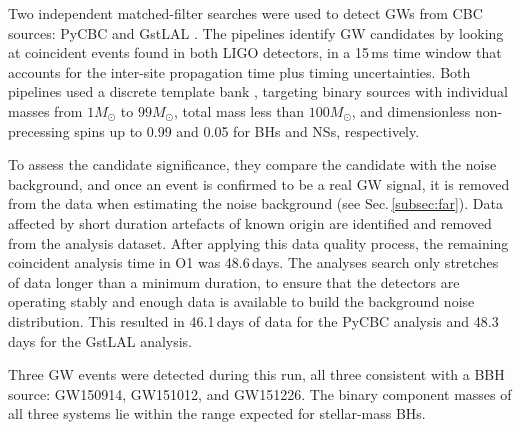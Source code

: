 \documentclass[binding=0.6cm, LaM]{sapthesis}
\begin{document}
	Two independent matched-filter searches were used to detect GWs from CBC sources: 
	{\ttfamily PyCBC} \cite{109, 110, 111, 112} and {\ttfamily GstLAL} \cite{112, 113, 114}.
	The pipelines identify GW candidates by looking at coincident events 
	found in both LIGO detectors, in a 15\,ms time window 
	that accounts for the inter-site propagation time plus timing uncertainties. 
	Both pipelines used a discrete template bank \cite{42, 114, 115, 117, 118, 119, 120}, 
	targeting binary sources with individual masses from $1{M_\odot}$ to $99{M_\odot}$,
	total mass less than $100{M_\odot}$, and dimensionless non-precessing spins up to 0.99 and 0.05 for BHs and NSs, respectively.

	To assess the candidate significance, they compare the candidate with the noise background, 
	and once an event is confirmed to be a real GW signal, 
	it is removed from the data when estimating the noise background (see Sec.\,\ref{subsec:far}).
	Data affected by short duration artefacts of known origin are identified and removed from the analysis dataset.
	After applying this data quality process, the remaining coincident analysis time in O1 was 48.6\,days. 
	The analyses search only stretches of data longer than a minimum duration, 
	to ensure that the detectors are operating stably and enough data is available to build the background noise distribution.  
	This resulted in 46.1\,days of data for the {\ttfamily PyCBC} analysis and 48.3\,days for the {\ttfamily GstLAL} analysis.

	Three GW events were detected during this run, all three consistent with a BBH source: GW150914, GW151012, and GW151226.
	The binary component masses of all three systems lie 
	within the range expected for stellar-mass BHs. 
\end{document}
